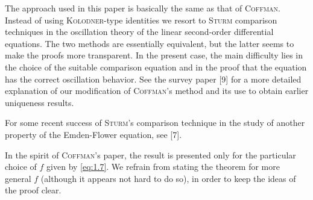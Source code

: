 The approach used in this paper is basically the same as that of \textsc{Coffman}.
Instead of using \textsc{Kolodner}-type identities we resort to \textsc{Sturm} comparison
techniques in the oscillation theory of the linear second-order differential equations.
The two methods are essentially equivalent, but the latter seems to make the proofs
more transparent. In the present case, the main difficulty lies in the choice of the
suitable comparison equation and in the proof that the equation has the correct
oscillation behavior. See the survey paper [9] for a more detailed explanation
of our modification of \textsc{Coffman}'s method and its use to obtain
earlier uniqueness results.

For some recent success of \textsc{Sturm}'s comparison technique in the study
of another property of the Emden-Flower equation, see [7].

In the spirit of \textsc{Coffman}'s paper, the result is presented only for the
particular choice of $f$ given by \eqref{eq:1.7}.
We refrain from stating the theorem for more general $f$
(although it appears not hard to do so), in order to keep the ideas of the proof clear.